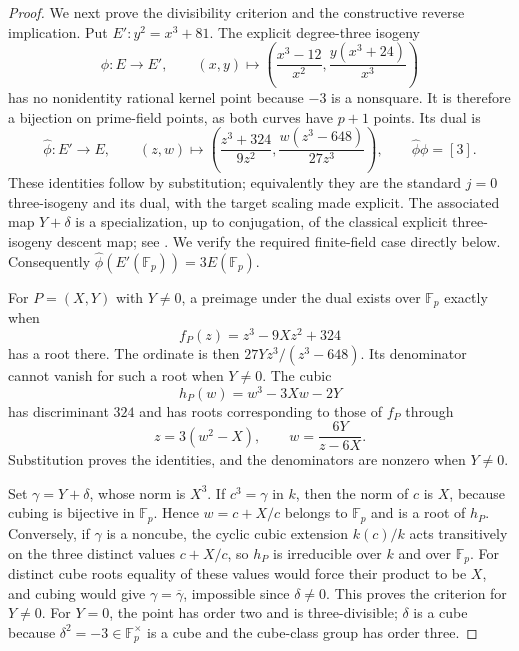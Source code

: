 \documentclass[11pt]{article}
\theoremstyle{definition}
\theoremstyle{remark}
\begin{document}
\begin{proof}
We next prove the divisibility criterion and the constructive
reverse implication.  Put $E':y^2=x^3+81$.  The explicit
degree-three isogeny
\[
 \phi:E\longrightarrow E',\qquad
 (x,y)\longmapsto
 \left(\frac{x^3-12}{x^2},
       \frac{y(x^3+24)}{x^3}\right)
\]
has no nonidentity rational kernel point because $-3$ is a
nonsquare.  It is therefore a bijection on prime-field points,
as both curves have $p+1$ points.  Its dual is
\[
 \widehat\phi:E'\longrightarrow E,\qquad
 (z,w)\longmapsto
 \left(\frac{z^3+324}{9z^2},
       \frac{w(z^3-648)}{27z^3}\right),
 \qquad \widehat\phi\phi=[3].
\]
These identities follow by substitution; equivalently they are
the standard $j=0$ three-isogeny and its dual, with the target
scaling made explicit.  The associated map $Y+\delta$ is a
specialization, up to conjugation, of the classical explicit
three-isogeny descent map; see
\cite[Definition~1.3 and Proposition~1.4, p.~372]{CohenPazuki2009}.
We verify the required finite-field case directly below.
Consequently
$\widehat\phi(E'(\mathbb F_p))=3E(\mathbb F_p)$.

For $P=(X,Y)$ with $Y\ne0$, a preimage under the dual exists
over $\mathbb F_p$ exactly when
\[
 f_P(z)=z^3-9Xz^2+324
\]
has a root there.  The ordinate is then
$27Yz^3/(z^3-648)$.  Its denominator cannot vanish for such
a root when $Y\ne0$.  The cubic
\[
 h_P(w)=w^3-3Xw-2Y
\]
has discriminant $324$ and has roots corresponding to those
of $f_P$ through
\[
 z=3(w^2-X),\qquad w=\frac{6Y}{z-6X}.
\]
Substitution proves the identities, and the denominators are
nonzero when $Y\ne0$.

Set $\gamma=Y+\delta$, whose norm is $X^3$.
If $c^3=\gamma$ in $k$, then the norm of $c$ is $X$, because
cubing is bijective in $\mathbb F_p$.  Hence
$w=c+X/c$ belongs to $\mathbb F_p$ and is a root of $h_P$.
Conversely, if $\gamma$ is a noncube, the cyclic cubic
extension $k(c)/k$ acts transitively on the three distinct
values $c+X/c$, so $h_P$ is irreducible over $k$ and over
$\mathbb F_p$.  For distinct cube roots equality of these
values would force their product to be $X$, and cubing would
give $\gamma=\overline\gamma$, impossible since $\delta\ne0$.
This proves the criterion for $Y\ne0$.  For $Y=0$, the point
has order two and is three-divisible; $\delta$ is a cube
because $\delta^2=-3\in\mathbb F_p^\times$ is a cube and
the cube-class group has order three.


\end{proof}
\end{document}
